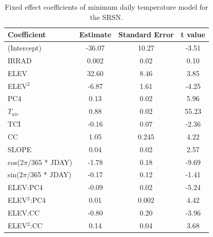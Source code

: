\documentclass{ametsoc}
\begin{document}
\begin{table}[t]
\caption{Fixed effect coefficients of minimum daily temperature model for the SRSN.}\label{tab:3}
\begin{center}
\begin{tabular}{lccc}
\hline\hline
Coefficient            & Estimate & Standard Error & t value \\
\hline
(Intercept)            & -36.07 & 10.27       & -3.51 \\
IRRAD                  & 0.002  & 0.02        & 0.10  \\
ELEV                   & 32.60  & 8.46        & 3.85  \\
ELEV$^2$               & -6.87  & 1.61        & -4.25 \\
PC4                    & 0.13   & 0.02        & 5.96  \\
$T_{air}$              & 0.88   & 0.02        & 55.23 \\
TCI                    & -0.16  & 0.07        & -2.36 \\
CC                     & 1.05   & 0.245       & 4.22  \\
SLOPE                  & 0.04   & 0.02        & 2.57  \\
cos(2$\pi$/365 * JDAY) & -1.78  & 0.18        & -9.69 \\
sin(2$\pi$/365 * JDAY) & -0.17  & 0.12        & -1.41 \\
ELEV:PC4               & -0.09  & 0.02        & -5.24 \\
ELEV$^2$:PC4           & 0.01   & 0.002       & 4.42  \\
ELEV:CC                & -0.80  & 0.20        & -3.96 \\
ELEV$^2$:CC            & 0.14   & 0.04        & 3.68  \\
\hline
\end{tabular}
\end{center}
\end{table}
\end{document}

